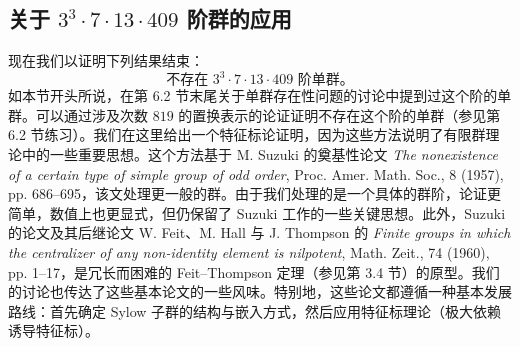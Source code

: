 \subsection*{关于 $3^3\cdot7\cdot13\cdot409$ 阶群的应用}

现在我们以证明下列结果结束：
\[
  \text{不存在 }3^3\cdot7\cdot13\cdot409\text{ 阶单群。}
\]
如本节开头所说，在第 6.2 节末尾关于单群存在性问题的讨论中提到过这个阶的单群。可以通过涉及次数 $819$ 的置换表示的论证证明不存在这个阶的单群（参见第 6.2 节练习）。我们在这里给出一个特征标论证明，因为这些方法说明了有限群理论中的一些重要思想。这个方法基于 M. Suzuki 的奠基性论文 \emph{The nonexistence of a certain type of simple group of odd order}, Proc. Amer. Math. Soc., 8 (1957), pp. 686--695，该文处理更一般的群。由于我们处理的是一个具体的群阶，论证更简单，数值上也更显式，但仍保留了 Suzuki 工作的一些关键思想。此外，Suzuki 的论文及其后继论文 W. Feit、M. Hall 与 J. Thompson 的 \emph{Finite groups in which the centralizer of any non-identity element is nilpotent}, Math. Zeit., 74 (1960), pp. 1--17，是冗长而困难的 Feit--Thompson 定理（参见第 3.4 节）的原型。我们的讨论也传达了这些基本论文的一些风味。特别地，这些论文都遵循一种基本发展路线：首先确定 Sylow 子群的结构与嵌入方式，然后应用特征标理论（极大依赖诱导特征标）。


